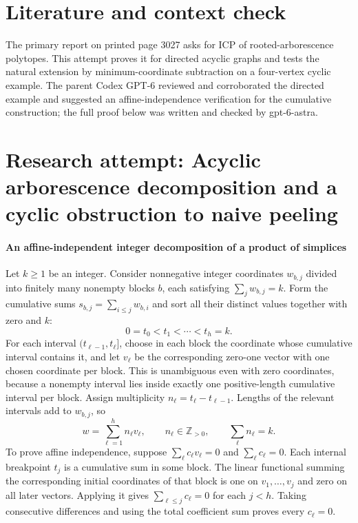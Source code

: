 \documentclass[11pt]{article}
\begin{document}
\section{Literature and context check}
The primary report on printed page 3027 asks for ICP of rooted-arborescence polytopes. This attempt proves it for directed acyclic graphs and tests the natural extension by minimum-coordinate subtraction on a four-vertex cyclic example. The parent Codex GPT-6 reviewed and corroborated the directed example and suggested an affine-independence verification for the cumulative construction; the full proof below was written and checked by gpt-6-astra.
\section{Research attempt: Acyclic arborescence decomposition and a cyclic obstruction to naive peeling}

\paragraph{An affine-independent integer decomposition of a product of simplices}
Let $k\geq1$ be an integer. Consider nonnegative integer coordinates $w_{b,j}$ divided into finitely many nonempty blocks $b$, each satisfying $\sum_jw_{b,j}=k$. Form the cumulative sums $s_{b,j}=\sum_{i\leq j}w_{b,i}$ and sort all their distinct values together with zero and $k$:
\[
 0=t_0<t_1<\cdots<t_h=k.
\]
For each interval $(t_{\ell-1},t_\ell]$, choose in each block the coordinate whose cumulative interval contains it, and let $v_\ell$ be the corresponding zero-one vector with one chosen coordinate per block. This is unambiguous even with zero coordinates, because a nonempty interval lies inside exactly one positive-length cumulative interval per block. Assign multiplicity $n_\ell=t_\ell-t_{\ell-1}$. Lengths of the relevant intervals add to $w_{b,j}$, so
\[
 w=\sum_{\ell=1}^h n_\ell v_\ell,\qquad
 n_\ell\in\mathbb Z_{>0},\qquad\sum_\ell n_\ell=k.
\]
To prove affine independence, suppose $\sum_\ell c_\ell v_\ell=0$ and $\sum_\ell c_\ell=0$. Each internal breakpoint $t_j$ is a cumulative sum in some block. The linear functional summing the corresponding initial coordinates of that block is one on $v_1,\ldots,v_j$ and zero on all later vectors. Applying it gives $\sum_{\ell\leq j}c_\ell=0$ for each $j<h$. Taking consecutive differences and using the total coefficient sum proves every $c_\ell=0$.
\end{document}
